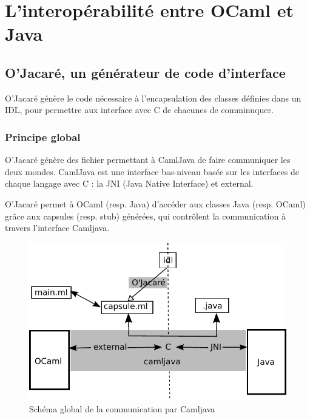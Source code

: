 \documentclass[a4paper, 11pt, notitlepage]{article}
\begin{document}
\newpage

\section{L'interopérabilité entre OCaml et Java}


\subsection{O'Jacaré, un générateur de code d'interface}
O'Jacaré génère le code nécessaire à l'encapsulation des classes
définies dans un IDL, pour permettre aux interface avec C de chacunes
de comminuquer.

\subsubsection{Principe global}
O'Jacaré génère des fichier permettant à CamlJava de faire communiquer les deux mondes. 
CamlJava est une interface bas-niveau basée sur les interfaces de chaque langage avec C : la JNI (Java Native Interface) et external.

O'Jacaré permet à OCaml (resp. Java) d'accéder aux classes Java (resp. OCaml) grâce aux capsules (resp. stub) générées, qui contrôlent la communication à travers l'interface Camljava.

\begin{figure}[h]
  \centering
  \includegraphics{schemaCamljava2.pdf}
  \caption{Schéma global de la communication par Camljava}
\end{figure}
\end{document}
